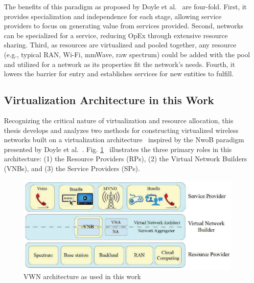 \documentclass[12pt,dvipsnames]{report}
\begin{document}
The benefits of this paradigm as proposed by Doyle et al.~\cite{6737248} are four-fold.  First, it provides specialization and independence for each stage, allowing service providers to focus on generating value from services provided.  Second, networks can be specialized for a service, reducing OpEx through extensive resource sharing.  Third, as resources are virtualized and pooled together, any resource (e.g., typical RAN, Wi-Fi, mmWave, raw spectrum) could be added with the pool and utilized for a network as its properties fit the network's needs.  Fourth, it lowers the barrier for entry and establishes services for new entities to fulfill.

\subsection{Virtualization Architecture in this Work} \label{subsec:virtualization_architecture}

Recognizing the critical nature of virtualization and resource allocation, this thesis develops and analyzes two methods for constructing virtualized wireless networks built on a virtualization architecture~\cite{MJ_CCNC_16, MJ_MECOMM_17} inspired by the NwoB paradigm presented by Doyle et al.~\cite{6737248}.  Fig. \ref{fig:VWNArchitecture}~\cite{MJ_CCNC_16, MJ_MECOMM_17} illustrates the three primary roles in this architecture: (1) the Resource Providers (RPs), (2) the Virtual Network Builders (VNBs), and (3) the Service Providers (SPs).

\begin{figure}
	\centering
	\includegraphics[width=\linewidth]{VWNArchitecture}
	\caption[VWN architecture as used in this work]{\small VWN architecture as used in this work~\cite{MJ_CCNC_16, MJ_MECOMM_17}}
	\label{fig:VWNArchitecture}
\end{figure}
\end{document}

